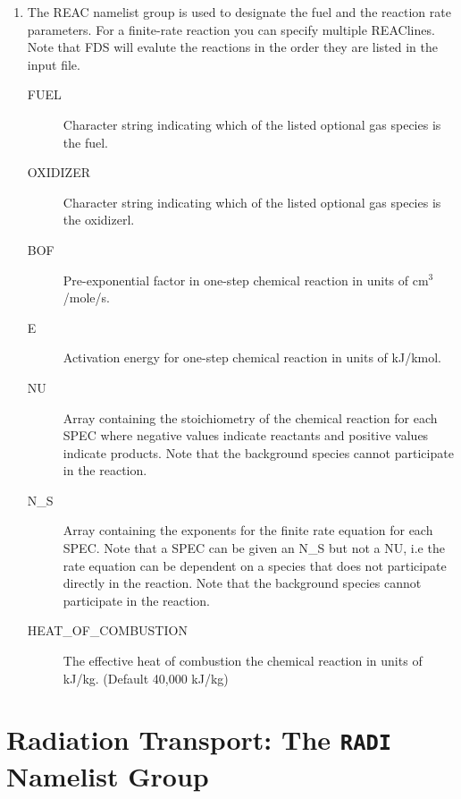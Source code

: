 \documentclass[11pt]{book}
\begin{document}
\begin{enumerate}
\item The {\ct REAC} namelist group is used to designate the fuel and the reaction rate
parameters.  For a finite-rate reaction you can specify multiple {\ct REAC}lines.  Note that
FDS will evalute the reactions in the order they are listed in the input file. %
\begin{description}
\item[{\ct FUEL}] Character string indicating which of the listed
optional gas species is the fuel.
\item[{\ct OXIDIZER}] Character string indicating which of the listed
optional gas species is the oxidizerl.
\item[{\ct BOF}] Pre-exponential factor in one-step chemical reaction in
units of cm$^3$/mole/s.
\item[{\ct E}] Activation energy for one-step chemical reaction in
units of kJ/kmol.
\item[{\ct NU}] Array containing the stoichiometry of the chemical reaction for each {\ct SPEC} where
negative values indicate reactants and positive values indicate products.  Note that the background species
cannot participate in the reaction.
\item[{\ct N\_S}] Array containing the exponents for the finite rate equation for each {\ct SPEC}.
Note that a {\ct SPEC} can be given an {\ct N\_S} but not a {\ct NU}, i.e the rate equation can
be dependent on a species that does not participate directly in the reaction.  Note that the background species
cannot participate in the reaction.
\item[{\ct HEAT\_OF\_COMBUSTION}] The effective heat of combustion the chemical reaction in units of kJ/kg. (Default 40,000 kJ/kg)
\end{description}

\end{enumerate}




\section{Radiation Transport: The \texorpdfstring{{\tt RADI}}{RADI} Namelist Group}
\label{info:RADI}
\end{document}
